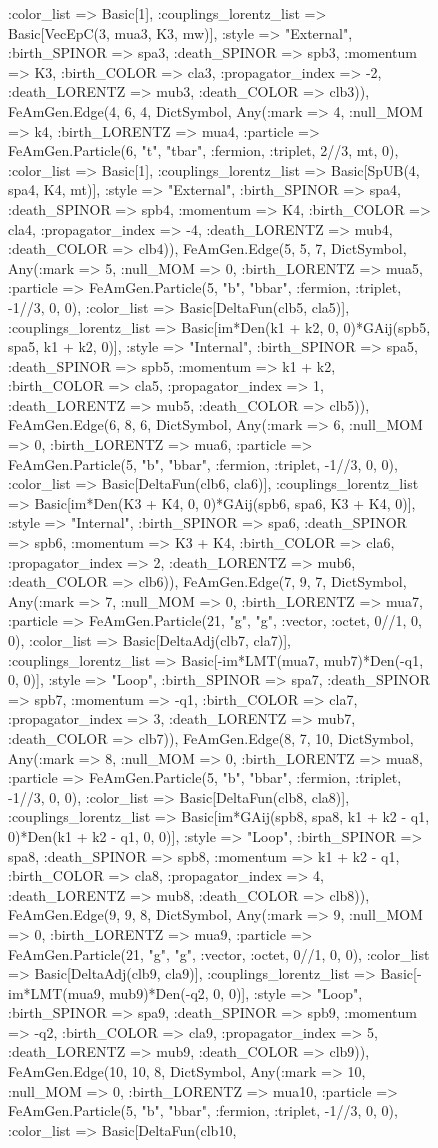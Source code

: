 \documentclass{revtex4}
\begin{document}
\begin{figure}[!htb]
\begin{center}
{:color_list => Basic[1], :couplings_lorentz_list => Basic[VecEpC(3, mua3, K3, mw)], :style => "External", :birth_SPINOR => spa3, :death_SPINOR => spb3, :momentum => K3, :birth_COLOR => cla3, :propagator_index => -2, :death_LORENTZ => mub3, :death_COLOR => clb3)), FeAmGen.Edge(4, 6, 4, Dict{Symbol, Any}(:mark => 4, :null_MOM => k4, :birth_LORENTZ => mua4, :particle => FeAmGen.Particle(6, "t", "tbar", :fermion, :triplet, 2//3, mt, 0), :color_list => Basic[1], :couplings_lorentz_list => Basic[SpUB(4, spa4, K4, mt)], :style => "External", :birth_SPINOR => spa4, :death_SPINOR => spb4, :momentum => K4, :birth_COLOR => cla4, :propagator_index => -4, :death_LORENTZ => mub4, :death_COLOR => clb4)), FeAmGen.Edge(5, 5, 7, Dict{Symbol, Any}(:mark => 5, :null_MOM => 0, :birth_LORENTZ => mua5, :particle => FeAmGen.Particle(5, "b", "bbar", :fermion, :triplet, -1//3, 0, 0), :color_list => Basic[DeltaFun(clb5, cla5)], :couplings_lorentz_list => Basic[im*Den(k1 + k2, 0, 0)*GAij(spb5, spa5, k1 + k2, 0)], :style => "Internal", :birth_SPINOR => spa5, :death_SPINOR => spb5, :momentum => k1 + k2, :birth_COLOR => cla5, :propagator_index => 1, :death_LORENTZ => mub5, :death_COLOR => clb5)), FeAmGen.Edge(6, 8, 6, Dict{Symbol, Any}(:mark => 6, :null_MOM => 0, :birth_LORENTZ => mua6, :particle => FeAmGen.Particle(5, "b", "bbar", :fermion, :triplet, -1//3, 0, 0), :color_list => Basic[DeltaFun(clb6, cla6)], :couplings_lorentz_list => Basic[im*Den(K3 + K4, 0, 0)*GAij(spb6, spa6, K3 + K4, 0)], :style => "Internal", :birth_SPINOR => spa6, :death_SPINOR => spb6, :momentum => K3 + K4, :birth_COLOR => cla6, :propagator_index => 2, :death_LORENTZ => mub6, :death_COLOR => clb6)), FeAmGen.Edge(7, 9, 7, Dict{Symbol, Any}(:mark => 7, :null_MOM => 0, :birth_LORENTZ => mua7, :particle => FeAmGen.Particle(21, "g", "g", :vector, :octet, 0//1, 0, 0), :color_list => Basic[DeltaAdj(clb7, cla7)], :couplings_lorentz_list => Basic[-im*LMT(mua7, mub7)*Den(-q1, 0, 0)], :style => "Loop", :birth_SPINOR => spa7, :death_SPINOR => spb7, :momentum => -q1, :birth_COLOR => cla7, :propagator_index => 3, :death_LORENTZ => mub7, :death_COLOR => clb7)), FeAmGen.Edge(8, 7, 10, Dict{Symbol, Any}(:mark => 8, :null_MOM => 0, :birth_LORENTZ => mua8, :particle => FeAmGen.Particle(5, "b", "bbar", :fermion, :triplet, -1//3, 0, 0), :color_list => Basic[DeltaFun(clb8, cla8)], :couplings_lorentz_list => Basic[im*GAij(spb8, spa8, k1 + k2 - q1, 0)*Den(k1 + k2 - q1, 0, 0)], :style => "Loop", :birth_SPINOR => spa8, :death_SPINOR => spb8, :momentum => k1 + k2 - q1, :birth_COLOR => cla8, :propagator_index => 4, :death_LORENTZ => mub8, :death_COLOR => clb8)), FeAmGen.Edge(9, 9, 8, Dict{Symbol, Any}(:mark => 9, :null_MOM => 0, :birth_LORENTZ => mua9, :particle => FeAmGen.Particle(21, "g", "g", :vector, :octet, 0//1, 0, 0), :color_list => Basic[DeltaAdj(clb9, cla9)], :couplings_lorentz_list => Basic[-im*LMT(mua9, mub9)*Den(-q2, 0, 0)], :style => "Loop", :birth_SPINOR => spa9, :death_SPINOR => spb9, :momentum => -q2, :birth_COLOR => cla9, :propagator_index => 5, :death_LORENTZ => mub9, :death_COLOR => clb9)), FeAmGen.Edge(10, 10, 8, Dict{Symbol, Any}(:mark => 10, :null_MOM => 0, :birth_LORENTZ => mua10, :particle => FeAmGen.Particle(5, "b", "bbar", :fermion, :triplet, -1//3, 0, 0), :color_list => Basic[DeltaFun(clb10, }
\end{center}
\end{figure}
\end{document}
